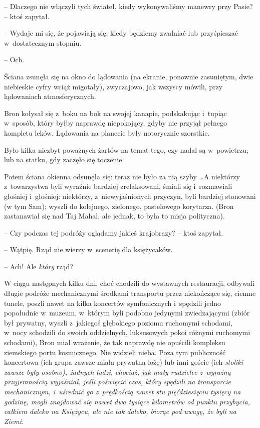 \documentclass[oneside,polish,11pt,rmheadings]{mwbk}
\begin{document}
-- Dlaczego nie włączyli tych świateł, kiedy wykonywaliśmy manewry przy Pasie? -- ktoś zapytał. 

-- Wydaje mi się, że pojawiają się, kiedy będziemy zwalniać lub przyśpieszać w~dostatecznym stopniu. 

-- Och. 

Ściana zsunęła się na okno do lądowania (na ekranie, ponownie zasuniętym, dwie niebieskie cyfry wciąż migotały), zwyczajowo, jak wszyscy mówili, przy lądowaniach atmosferycznych. 

Bron kołysał się z~boku na bok na swojej kanapie, podskakując i~tupiąc w~sposób, który byłby naprawdę niepokojący, gdyby nie przyjął pełnego kompletu leków. Lądowania na planecie były notorycznie szorstkie. 

Było kilka niezbyt poważnych żartów na temat tego, czy nadal są w~powietrzu; lub na statku, gdy zaczęło się toczenie. 

Potem ściana okienna odsunęła się: teraz nie było za nią szyby \ldots  A niektórzy z~towarzystwa byli wyraźnie bardziej zrelaksowani, śmiali się i~rozmawiali głośniej i~głośniej: niektórzy, z~niewyjaśnionych przyczyn, byli bardziej stonowani (w tym Sam); wyszli do kolejnego, zielonego, pastelowego korytarza. (Bron zastanawiał się nad Taj Mahal, ale jednak, to była to misja polityczna). 

-- Czy podczas tej podróży oglądamy jakieś krajobrazy? -- ktoś zapytał. 

-- Wątpię.  Rząd nie wierzy w~scenerię dla księżycaków. 

-- Ach! Ale \textit{który }rząd? 

W ciągu następnych kilku dni, choć chodzili do wystawnych restauracji, odbywali długie podróże mechanicznymi środkami transportu przez niekończące się, ciemne tunele, poszli nawet na kilka koncertów symfonicznych i~spędzili jedno popołudnie w~muzeum, w~którym byli podobno jedynymi zwiedzającymi (zbiór był prywatny, wyszli z~jakiegoś głębokiego poziomu ruchomymi schodami, w~nocy schodzili do swoich oddzielnych, luksusowych pokoi różnymi ruchomymi schodami), Bron miał wrażenie, że tak naprawdę nie opuścili kompleksu ziemskiego portu kosmicznego. Nie widzieli nieba. Poza tym publiczność koncertowa (ich grupa zawsze miała prywatną lożę) lub inni goście (ich \textit{stoliki zawsze były osobno), żadnych ludzi, chociaż, jak mały rudzielec z~wyraźną przyjemnością wyjaśniał, jeśli poświęcić czas, który spędzili na transporcie mechanicznym, i~uśrednić go z~prędkością nawet stu pięćdziesięciu tysięcy na godzinę, mogli znajdować się nawet dwa tysiące kilometrów od punktu przybycia,  całkiem daleko na Księżycu, ale nie tak daleko, biorąc pod uwagę, że byli na Ziemi.} 
\end{document}
